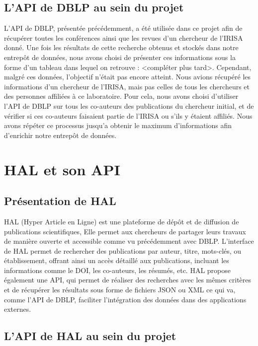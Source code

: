 \documentclass[a4paper,12pt]{article}
\begin{document}
\subsection{L'API de DBLP au sein du projet}
L'API de DBLP, présentée précédemment, a été utilisée dans ce projet afin de récupérer toutes les conférences ainsi que les revues d'un chercheur de l'IRISA donné. Une fois les résultats de cette recherche obtenus et stockés dans notre entrepôt de données, 
nous avons choisi de présenter ces informations sous la forme d'un tableau dans lequel on retrouve : <compléter plus tard>. Cependant, malgré ces données, l'objectif n'était pas encore atteint. Nous avions récupéré les informations d'un chercheur de l'IRISA, 
mais pas celles de tous les chercheurs et des personnes affiliées à ce laboratoire. Pour cela, nous avons choisi d'utiliser l'API de DBLP sur tous les co-auteurs des publications du chercheur initial, et de vérifier si ces co-auteurs faisaient partie de l'IRISA 
ou s'ils y étaient affiliés. Nous avons répéter ce processus jusqu'a obtenir le maximum d'informations afin d'enrichir notre entrepôt de données.


\section{HAL et son API}

\subsection{Présentation de HAL}
HAL (Hyper Article en Ligne) est une plateforme de dépôt et de diffusion de publications scientifiques, Elle permet aux chercheurs de partager leurs travaux de manière ouverte et accessible comme vu précédemment avec DBLP. L'interface de HAL 
permet de rechercher des publications par auteur, titre, mots-clés, ou établissement, offrant ainsi un accès détaillé aux publications, incluant les informations comme le DOI, les co-auteurs, les résumés, etc. HAL propose également une API, 
qui permet de réaliser des recherches avec les mêmes critères et de récupérer les résultats sous forme de fichiers JSON ou XML ce qui va, comme l'API de DBLP, faciliter l'intégration des données dans des applications externes.

\subsection{L'API de HAL au sein du projet}
\end{document}
